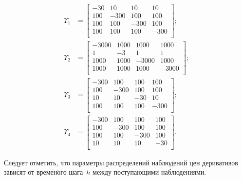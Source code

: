 \begin{multicols}{2}
\begin{enumerate}[(1)]
\noindent
\begin{align*}
\Upsilon_1&=\left[
\begin{array}{cccc}
-30 & 10 & 10 & 10 \\
100 & -300 & 100 & 100 \\
100 & 100 & -300 & 100 \\
100 & 100 & 100 & -300 \\
\end{array}
\right];
\\
\Upsilon_2&=\left[
\begin{array}{cccc}
-3000 & 1000 & 1000 & 1000 \\
1 & -3 & 1 & 1 \\
1000 & 1000 & -3000 & 1000 \\
1000 & 1000 & 1000 & -3000 \\
\end{array}
\right];
\\
\Upsilon_3&=\left[
\begin{array}{cccc}
-300 & 100 & 100 & 100 \\
100 & -300 & 100 & 100 \\
10 & 10 & -30 & 10 \\
100 & 100 & 100 & -300 \\
\end{array}
\right];
\\
\Upsilon_4&=\left[
\begin{array}{cccc}
-300 & 100 & 100 & 100 \\
100 & -300 & 100 & 100 \\
100 & 100 & -300 & 100 \\
10 & 10 & 10 & -30 \\
\end{array}
\right].
\end{align*}
\end{enumerate}

\vspace*{-8pt}

\noindent
Следует отметить, что параметры распределений наблюдений цен деривативов зависят 
от времен$\acute{\mbox{о}}$го шага~$h$ между поступающими наблюдениями.


\end{multicols}
